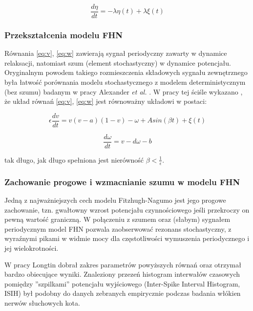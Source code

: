   \begin{equation} \label{eq:eta}
    \frac{d \eta}{dt} = -\lambda \eta(t) + \lambda \xi(t)
  \end{equation}

  

  \subsubsection{Przekształcenia modelu FHN}

  Równania \ref{eq:v}, \ref{eq:w} zawierają sygnał periodyczny zawarty w dynamice relaksacji, natomiast szum (element stochastyczny) w dynamice potencjału. Oryginalnym powodem takiego rozmieszczenia składowych sygnału zewnętrznego była łatwość porównania modelu stochastycznego z modelem deterministycznym (bez szumu) badanym w pracy Alexander \emph{et al.} \cite{alexander}. W pracy tej ściśle wykazano \cite{longtin}, że układ równań \ref{eq:v}, \ref{eq:w} jest równoważny układowi w postaci:

  \begin{equation}
    \epsilon \frac{dv}{dt} = v(v-a)(1-v)- \omega + A sin(\beta t) + \xi(t)
  \end{equation}

  \begin{equation}
    \frac{d \omega}{dt} = v - d \omega - b
  \end{equation}

  tak długo, jak długo spełniona jest nierówność $\beta < \frac{1}{\epsilon}$.

  \subsubsection{Zachowanie progowe i wzmacnianie szumu w modelu FHN}

  Jedną z najważniejszych cech modelu Fitzhugh-Nagumo jest jego progowe zachowanie, tzn. gwałtowny wzrost potencjału czynnościowego jeśli przekroczy on pewną wartość graniczną. W połączeniu z szumem oraz (słabym) sygnałem periodycznym model FHN pozwala zaobserwować rezonans stochastyczny, z wyraźnymi pikami w widmie mocy dla częstotliwości wymuszenia periodycznego i jej wielokrotności.


  W pracy \cite{longtin} Longtin dobrał zakres parametrów powyższych równań oraz otrzymał bardzo obiecujące wyniki. Znaleziony przezeń histogram interwałów czasowych pomiędzy ''szpilkami'' potencjału wyjściowego (Inter-Spike Interval Histogram, ISIH) był podobny do danych zebranych empirycznie podczas badania włókien nerwów słuchowych kota.

